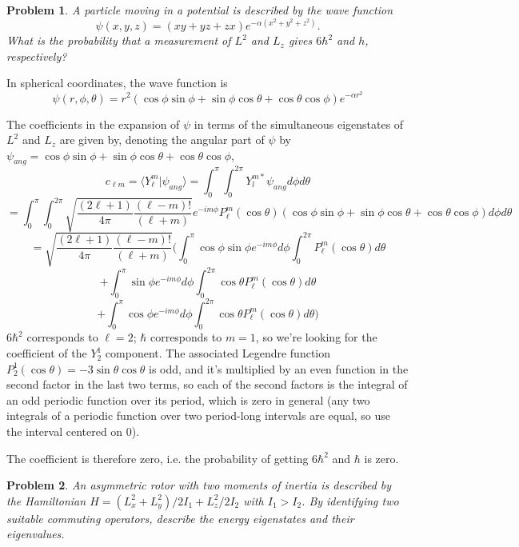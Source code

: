 \documentclass{article}
\newtheorem{prob}{Problem}
\begin{document}
\begin{prob}
  A particle moving in a potential is described by the wave function
  \[
    \psi(x,y,z) = (xy+yz+zx)e^{-\alpha(x^{2}+y^{2}+z^{2})}.
  \]
  What is the probability that a measurement of $L^{2}$ and $L_{z}$ gives $6\hbar^{2}$ and $h$, respectively?
\end{prob}

In spherical coordinates, the wave function is
\[
  \psi(r, \phi, \theta) = r^{2}(\cos\phi\sin\phi + \sin\phi\cos\theta + \cos\theta\cos\phi)e^{-\alpha r^{2}}
\]

The coefficients in the expansion of $\psi$ in terms of the simultaneous eigenstates of $L^{2}$ and $L_{z}$ are given by,
denoting the angular part of $\psi$ by  $\psi_{ang} = \cos\phi\sin\phi + \sin\phi\cos\theta + \cos\theta\cos\phi$,
\[
  c_{\ell m} = \langle Y_{\ell}^{m} |  \psi_{ang} \rangle = \int_{0}^{\pi}\int_{0}^{2\pi} Y_{l}^{m*} \psi_{ang} d\phi d\theta
\]
\[
  = \int_{0}^{\pi}\int_{0}^{2\pi}\sqrt{\frac{(2\ell + 1)}{4\pi}\frac{(\ell-m)!}{(\ell+m)}} e^{-im\phi}P_{\ell}^{m}(\cos\theta)
  (\cos\phi\sin\phi + \sin\phi\cos\theta + \cos\theta\cos\phi)d\phi d\theta
\]
\[
  = \sqrt{\frac{(2\ell + 1)}{4\pi}\frac{(\ell-m)!}{(\ell+m)}} \bigg(
  \int_{0}^{\pi}\cos\phi\sin\phi e^{-im\phi}d\phi\int_{0}^{2\pi}P_{\ell}^{m}(\cos\theta)d\theta
\]
\[
  + \int_{0}^{\pi}\sin\phi e^{-im\phi}d\phi\int_{0}^{2\pi}\cos\theta P_{\ell}^{m}(\cos\theta)d\theta
\]
\[
  + \int_{0}^{\pi}\cos\phi e^{-im\phi}d\phi\int_{0}^{2\pi}\cos\theta P_{\ell}^{m}(\cos\theta)d\theta \bigg)
\]
$6\hbar^{2}$ corresponds to $\ell = 2$; $\hbar$ corresponds to $m = 1$, so we're looking for the coefficient of the $Y_{2}^{1}$ component.
The associated Legendre function $P_{2}^{1}(\cos\theta) = -3\sin\theta\cos\theta$ is odd, and it's multiplied by an even function in the second factor
in the last two terms, so each of the second factors is the integral of an odd periodic function over its period, which is zero in general
(any two integrals of a periodic function over two period-long intervals are equal, so use the interval centered on 0).

The coefficient is therefore zero, i.e. the probability of getting $6\hbar^{2}$ and $\hbar$ is zero.

\begin{prob}
  An asymmetric rotor with two moments of inertia is described by the Hamiltonian $H = (L_{x}^{2} + L_{y}^{2}) / 2I_{1} + L_{z}^{2}/2I_{2}$ with $I_{1}>I_{2}$.
  By identifying two suitable commuting operators, describe the energy eigenstates and their eigenvalues.
\end{prob}
\end{document}
